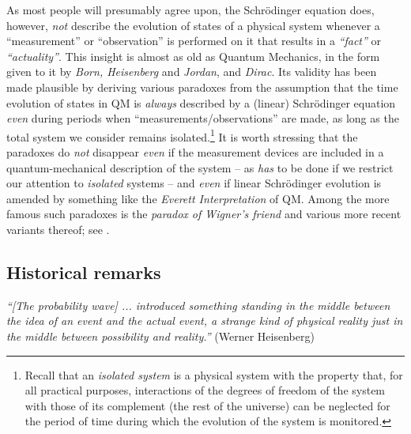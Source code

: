 \documentclass[a4paper,11pt]{article}
\begin{document}
As most people will presumably agree upon, the Schr\"odinger equation does, however, 
\textit{not} describe the evolution of states of a physical system whenever a ``measurement'' or ``observation'' is 
performed on it that results in a \textit{``fact''} or \textit{``actuality''}. This insight is almost as old as Quantum Mechanics, 
in the form given to it by \textit{Born, Heisenberg} and \textit{Jordan}, and \textit{Dirac}. Its validity has been made 
plausible by deriving various paradoxes from the assumption that the time evolution of states in QM is \textit{always} 
described by a (linear) Schr\"odinger equation \textit{even} during periods when ``measurements/observations'' 
are made, as long as the total system we consider remains isolated.\footnote{Recall that an \textit{isolated system} 
is a physical system with the property that, for all practical purposes, interactions of the degrees of freedom of the 
system with those of its complement (the rest of the universe) can be neglected for the period of time during which 
the evolution of the system is monitored.}
It is worth stressing that the paradoxes do \textit{not} disappear \textit{even} if the measurement devices are included 
in a quantum-mechanical description of the system -- as \textit{has} to be done if we restrict our attention to 
\textit{isolated} systems -- and \textit{even} if linear Schr\"odinger evolution is amended by something like the 
\textit{Everett Interpretation} \cite{Everett} of QM. Among the more famous such paradoxes is the \textit{paradox 
of Wigner's friend} \cite{Wigner} and various more recent variants thereof; see \cite{Hardy, FR}. 

\subsection{Historical remarks}

\hspace{0.5cm}\textit{``[The probability wave] ... introduced something standing in the middle between the idea of an event and the actual event, a strange kind of physical reality just in the middle between possibility and reality.''} (Werner Heisenberg)
\end{document}
